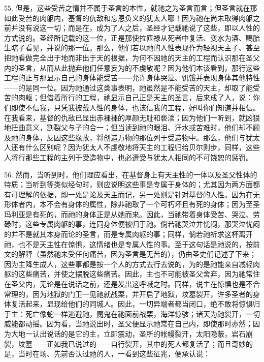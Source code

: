 55. 但是，这些受苦之情并不属于圣言的本性，就祂之为圣言而言；但圣言就在那如此受苦的肉躯内，基督的仇敌和忘恩负义的犹太人哪！因为祂在尚未取得肉躯之前并没有说这一切；而是在，成为了人之后，圣经才记载祂说了这些，即以人性的方式说的。圣经所记载的这一位，正是那使拉匝禄从死者中复活、变水为酒、赐胎生瞎子看见，并说的那一位。那么，他们若以祂的人性表现作为轻视天主子、甚至把祂看做完全出于地而非出于天的根据，为何不因祂的天主的工程而认识那在圣父内的圣言，从而从此抛弃他们任意妄为的不虔敬呢？因为他们本该看到，那行这些工程的正与那显示自己的身体能受苦——允许身体哭泣、饥饿并表现身体其他特性——的是同一位。因为祂通过这类事表明，祂虽然是不能受苦的天主，却取了能受苦的肉躯；但借着所行的工程，祂显示自己正是天主的圣言，后来成了人，说：你们即使不信我，只凭我披戴人性的身体，也该信我的工程，好叫你们知道并相信。在我看来，基督的仇敌已显出赤裸裸的厚颜无耻和亵渎；因为他们一听到，就凶狠地扭曲意义，割裂父与子的合一；但当读到祂的眼泪、汗水或苦难时，他们却不顾及祂的身体，反因这些缘故，将创造万物的那位列于受造物中。那么，他们与犹太人还有什么区别呢？因为犹太人不虔敬地将天主的工程归给贝尔则步，同样，这些人将行那些工程的主列于受造物中，也必遭受与犹太人相同的不可饶恕的惩罚。\par

56. 然而，当听到时，他们理应看出，在基督身上有天主性的一体以及圣父性体的特质；当听到等类似经句时，则应说明这些事是专属于身体的；尤其因为两方面都有可理解的依据，即一处是论及天主而记，另一处则是针对基督的人性。因为在无形体者内，本不会有身体的属性，除非祂取了一个可朽坏且有死的身体；因为至圣玛利亚是有死的，而祂的身体正是从她而来。因此，当祂带着身体受苦、哭泣、劳碌时，这些专属肉躯的事，连同身体便被归于祂。倘若祂哭泣并忧闷，那哭泣忧闷的并不是就其本身而论的圣言，而是专属肉躯的事；同样，倘若祂祈求这杯离开祂，也不是天主性在惊惧，这情绪也是专属人性的事。至于这句话是祂说的，按前文的解释（虽然祂未受任何痛苦，因为圣言是无苦的），仍由圣史们记述了下来；因为主降生成人，这些事都是按一个人的方式去行去说的，为的是祂能亲自减轻肉躯的这些痛苦，并使之摆脱这些痛苦。因此，主也不可能被圣父舍弃，因为祂常住在圣父内，无论是在说话之前，还是发出这呼喊之时。同样，说主在惊惧也是不合常理的，因为地狱的门卫一见祂就战栗，并开启了地狱，坟墓裂开，许多圣者的身体复活起来，显现给他们的同城人。因此，一切异端者都当闭口，绝不敢将惊惧归于主：死亡像蛇一样逃避祂，魔鬼在祂面前战栗，海洋惊骇；诸天为祂裂开，一切威能都动摇。因为看，当祂说出时，圣父便显示祂常在自己内，即使那时亦然；因为大地一认出说话的是它的主，立即震动，圣所的帐幔裂开，太阳隐蔽，岩石崩裂，坟墓——正如我已说过的——自行裂开，其中的死人都复活了；而且奇妙的是，当时在场、先前否认过祂的人，一看到这些征兆，便承认说：\par

